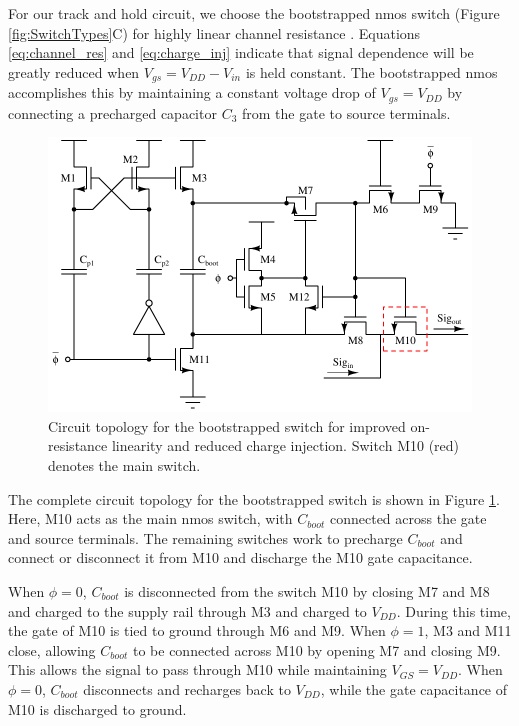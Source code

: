 \documentclass[10pt,journal]{IEEEtran}\usepackage{longtable}
\begin{document}
For our track and hold circuit, we choose the bootstrapped nmos switch (Figure \ref{fig:SwitchTypes}C) for highly linear channel resistance \cite{Razavi:boot}. Equations \ref{eq:channel_res} and \ref{eq:charge_inj} indicate that signal dependence will be greatly reduced when $V_{gs}=V_{DD}-V_{in}$ is held constant. The bootstrapped nmos accomplishes this by maintaining a constant voltage drop of $V_{gs}=V_{DD}$ by connecting a precharged capacitor $C_3$ from the gate to source terminals. 
\begin{figure}[tbph]
\begin{center}
\includegraphics[width=1\columnwidth]{BootstrappedSwitch.pdf}
\caption{Circuit topology for the bootstrapped switch for improved on-resistance linearity and reduced charge injection. Switch M10 (red) denotes the main switch.}
\label{fig:BootstrappedSwitch}
\end{center}
\end{figure}
The complete circuit topology for the bootstrapped switch is shown in Figure \ref{fig:BootstrappedSwitch}. Here, M10 acts as the main nmos switch, with $C_{boot}$ connected across the gate and source terminals. The remaining switches work to precharge $C_{boot}$ and connect or disconnect it from M10 and discharge the M10 gate capacitance.

When $\phi=0$, $C_{boot}$ is disconnected from the  switch M10 by closing M7 and M8 and charged to the supply rail through M3 and charged to $V_{DD}$. During this time, the gate of M10 is tied to ground through M6 and M9. When $\phi=1$, M3 and M11 close, allowing $C_{boot}$ to be connected across M10 by opening M7 and closing M9. This allows the signal to pass through M10 while maintaining $V_{GS}=V_{DD}$. When $\phi=0$, $C_{boot}$ disconnects and recharges back to $V_{DD}$, while the gate capacitance of M10 is discharged to ground.
\end{document}
